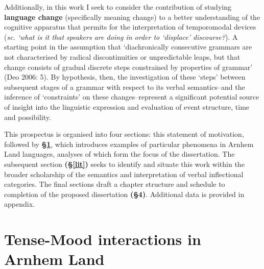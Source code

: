 \documentclass[12pt]{article}
\newcommand{\hk}[1]
 {\marginpar{\color{purple}\raggedleft\raggedright\hspace{0pt}\linespread{0.8}\footnotesize{#1}}}
\renewcommand{\hk}[1]{}
\begin{document}
Additionally, in this work I seek to consider the contribution of studying \textbf{language change} (specifically meaning change) to a better understanding of the cognitive apparatus that permits for the interpretation of temporomodal devices (\textit{sc. `what is it that speakers are doing in order to `displace' discourse?}). A starting point in the assumption that `diachronically consecutive grammars are not characterised by radical discontinuities or unpredictable leaps, but that change consists of gradual discrete steps constrained by properties of grammar' (Deo 2006: 5). By hypothesis, then, the investigation of these `steps' between subsequent stages of a grammar with respect to its verbal semantics--and the inference of `constraints' on these changes--represent a significant potential source of insight into the linguistic expression and evaluation of event structure, time and possibility.
\hk{Add a paragraph about what you expect the main contributions of your work to be. I imagine it's something like:  
• a description of several understudied languages, specifically with respect to their TMA systems. This is important for anyone working on these phenomena.\\• a theoretical framework that can provide a (compositional) analysis of the data, whether small or large changes to existing work or a new proposal remains to be seen. This is relevant for anyone who works on anything intensional, including modality, tense, aspect, evidentiality, conditionals (counterfactuals, unconditionals, etc), to name a few.\\• a diachronic perspective. This one you actually do a good job or spelling out.}

This prospectus is organised into four sections: this statement of motivation, followed by \textbf{§\ref{phen}}, which introduces examples of particular phenomena in Arnhem Land languages, analyses of which form the focus of the dissertation. The subsequent section \textbf{(§\ref{lit})} seeks to identify and situate this work within the broader scholarship of the semantics and interpretation of verbal inflectional categories. The final sections draft a chapter structure and schedule to completion of the proposed dissertation \textbf{(§4)}. Additional data is provided in appendix.



\section{Tense-Mood interactions in Arnhem Land}\label{phen}
\end{document}
